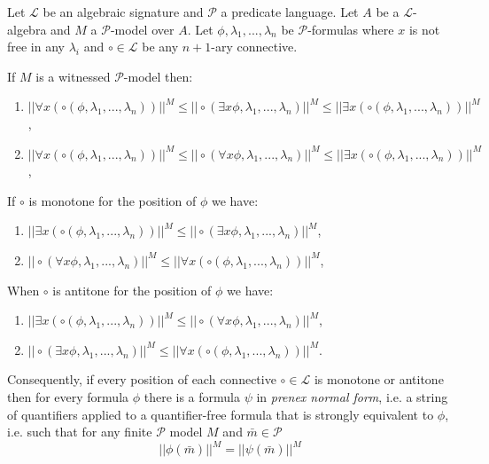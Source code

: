 \documentclass[10pt,a4paper]{amsart}
\newcommand{\CL}{\mathcal{L}}
\newcommand{\CP}{\mathcal{P}}
\begin{document}
\begin{prop}  
    Let $\CL$ be an algebraic signature and $\CP$ a predicate language. Let $A$ be a $\CL$-algebra and $M$ a $\CP$-model over $A$. Let $\phi,\lambda_1,...,\lambda_n$ be $\CP$-formulas where $x$ is not free in any $\lambda_i$ and $\circ\in\CL$ be any $n+1$-ary connective.

    \noindent
    If $M$ is a witnessed $\CP$-model then:\begin{enumerate}[label=\roman*.]
    \item $||\forall x(\circ(\phi,\lambda_1,...,\lambda_n))||^M\leq ||\circ(\exists x\phi, \lambda_1,...,\lambda_n)||^M\leq||\exists x(\circ(\phi,\lambda_1,...,\lambda_n))||^M$,
    \item $||\forall x(\circ(\phi,\lambda_1,...,\lambda_n))||^M\leq||\circ(\forall x\phi,\lambda_1,...,\lambda_n)||^M\leq ||\exists x(\circ(\phi,\lambda_1,...,\lambda_n))||^M$,
    \end{enumerate}
    \noindent
    If $\circ$ is monotone for the position of $\phi$ we have: \begin{enumerate}
        \item [iii.] $||\exists x(\circ(\phi,\lambda_1,...,\lambda_n))||^M\leq||\circ(\exists x\phi,\lambda_1,...,\lambda_n)||^M$,
        \item [iv.] $||\circ(\forall x\phi, \lambda_1,...,\lambda_n)||^M\leq||\forall x(\circ(\phi,\lambda_1,...,\lambda_n))||^M$,
    \end{enumerate}
    \noindent
    When $\circ$ is antitone for the position of $\phi$ we have:\begin{enumerate}
        \item [v.] $||\exists x(\circ(\phi,\lambda_1,...,\lambda_n))||^M \leq ||\circ(\forall x\phi,\lambda_1,...,\lambda_n)||^M$,
        \item [vi.] $||\circ(\exists x\phi,\lambda_1,...,\lambda_n)||^M\leq||\forall x(\circ(\phi,\lambda_1,...,\lambda_n))||^M$. 
    \end{enumerate}
    \noindent
    Consequently, if every position of each connective $\circ\in\CL$ is monotone or antitone then for every formula $\phi$ there is a formula $\psi$ in \textit{prenex normal form}, i.e. a string of quantifiers applied to a quantifier-free formula that is strongly equivalent to $\phi$, i.e. such that for any finite $\CP$ model $M$ and $\bar{m}\in\CP$ \[||\phi(\bar{m})||^M=||\psi(\bar{m})||^M\]
\end{prop}
\end{document}
